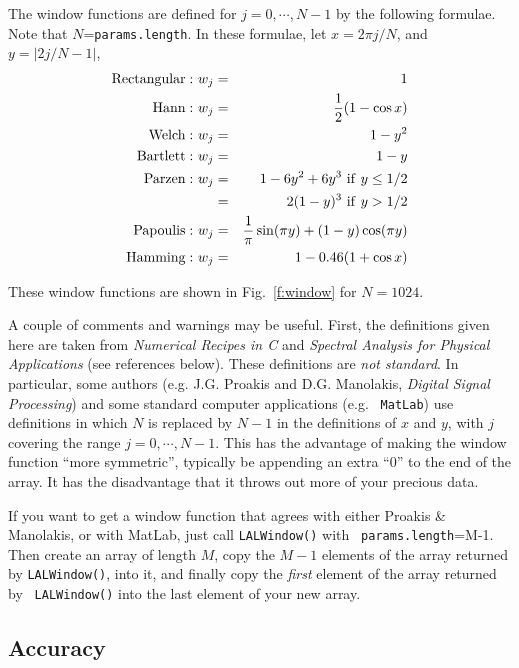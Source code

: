 \documentclass{article}
\begin{document}
The window functions are defined for $j=0,\cdots,N-1$ by the following
formulae.  Note that $N$={\tt params.length}.  In these formulae, let
$x=2 \pi j/N$, and $y=|2j/N-1|$,
\begin{eqnarray*}
{\rm Rectangular:\ } w_j &=& 1 \\
{\rm Hann:\ } w_j &=& {1 \over 2} ( 1 - \cos  x  ) \\
{\rm Welch:\ } w_j &=& 1 -  y^2 \\
{\rm Bartlett:\ } w_j &=& 1 -  y \\
{\rm Parzen:\ } w_j &=&  1 - 6 y^2 + 6 y^3  {\rm\ if\ } y\le 1/2\\
                    &=&  2 (1-y)^3 {\rm\ if\ } y>1/2\\
{\rm Papoulis:\ } w_j &=& {1 \over \pi} \sin (\pi  y  ) + ( 1 -  y  ) \cos (\pi  y  )\\
{\rm Hamming:\ } w_j &=& 1-0.46 (1 + \cos x ) \\
\end{eqnarray*}

These window functions are shown in Fig.~\ref{f:window} for $N=1024$.

A couple of comments and warnings may be useful.  First, the
definitions given here are taken from {\it Numerical Recipes in C} and
{\it Spectral Analysis for Physical Applications} (see references
below).  These definitions are {\it not standard}.  In particular,
some authors (e.g. J.G. Proakis and D.G. Manolakis, {\it Digital
Signal Processing}) and some standard computer applications (e.g. {\tt
MatLab}) use definitions in which $N$ is replaced by $N-1$ in the
definitions of $x$ and $y$, with $j$ covering the range
$j=0,\cdots,N-1$.  This has the advantage of making the window
function ``more symmetric'', typically be appending an extra ``0'' to
the end of the array.  It has the disadvantage that it throws out more
of your precious data.

If you want to get a window function that agrees with either Proakis
\& Manolakis, or with MatLab, just call {\tt LALWindow()} with {\tt
params.length}=M-1.  Then create an array of length $M$, copy the
$M-1$ elements of the array returned by {\tt LALWindow()}, into it,
and finally copy the {\it first} element of the array returned by {\tt
LALWindow()} into the last element of your new array.



\subsection{Accuracy}
\end{document}
